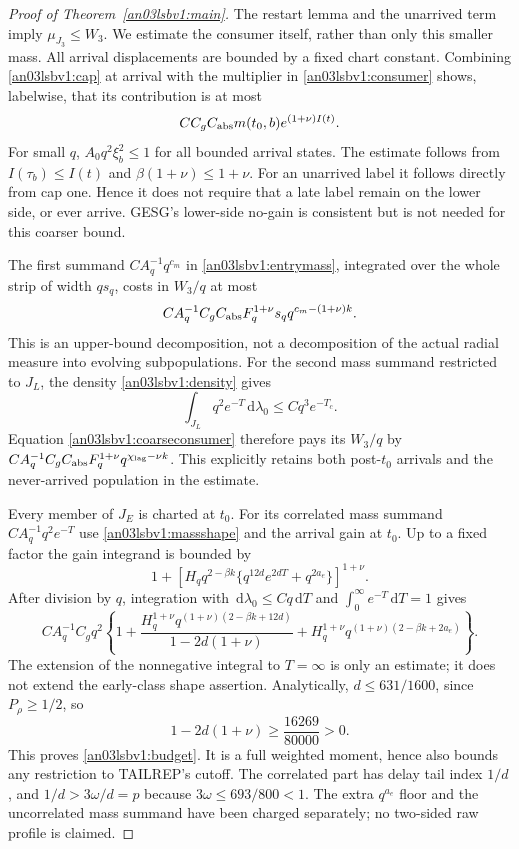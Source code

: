 \documentclass[11pt]{article}
\theoremstyle{remark}\newtheorem{remark}[theorem]{Remark}
\newcommand{\dd}{\,\mathrm d}
\begin{document}
\begin{proof}[Proof of Theorem~\ref{an03lsbv1:main}]
The restart lemma and the unarrived term imply $\mu_{J_3}\le W_3$.
We estimate the consumer itself, rather than only this smaller mass.
All arrival displacements are bounded by a fixed chart constant.
Combining \eqref{an03lsbv1:cap} at arrival with the multiplier in
\eqref{an03lsbv1:consumer} shows, labelwise, that its contribution is
at most
\begin{equation}
 C C_g C_{\rm abs}m(t_0,b)e^{(1+\nu)I(t)}.
 \label{an03lsbv1:coarseconsumer}
\end{equation}
For small $q$, $A_0q^2\xi_b^2\le1$ for all bounded arrival states.
The estimate follows from $I(\tau_b)\le I(t)$ and
$\beta(1+\nu)\le1+\nu$. For an unarrived label it follows directly
from cap one. Hence it does not require that a late label remain
on the lower side, or ever arrive. GESG's lower-side no-gain is
consistent but is not needed for this coarser bound.

The first summand $C A_q^{-1}q^{c_m}$ in
\eqref{an03lsbv1:entrymass}, integrated over the whole strip of
width $qs_q$, costs in $W_3/q$ at most
\[
 C A_q^{-1}C_g C_{\rm abs}F_q^{1+\nu}s_q
                          q^{c_m-(1+\nu)k}.
\]
This is an upper-bound decomposition, not a decomposition of the
actual radial measure into evolving subpopulations.
For the second mass summand restricted to $J_L$, the density
\eqref{an03lsbv1:density} gives
\[
 \int_{J_L}q^2e^{-T}\dd\lambda_0\le Cq^3e^{-T_c}.
\]
Equation \eqref{an03lsbv1:coarseconsumer} therefore pays its $W_3/q$
by $C A_q^{-1}C_g C_{\rm abs}F_q^{1+\nu}q^{\chi_{\rm lag}-\nu k}$.
This explicitly retains both post-$t_0$ arrivals and the never-arrived
population in the estimate.

Every member of $J_E$ is charted at $t_0$. For its correlated mass
summand $C A_q^{-1}q^2e^{-T}$ use
\eqref{an03lsbv1:massshape} and the arrival gain at $t_0$. Up to a
fixed factor the gain integrand is bounded by
\[
 1+\left[H_q q^{2-\beta k}
              \{q^{12d}e^{2dT}+q^{2a_e}\}\right]^{1+\nu}.
\]
After division by $q$, integration with
$\dd\lambda_0\le Cq\dd T$ and $\int_0^\infty e^{-T}\dd T=1$ gives
\[
 C A_q^{-1}C_g q^2\left\{1+
 \frac{H_q^{1+\nu}q^{(1+\nu)(2-\beta k+12d)}}
      {1-2d(1+\nu)}
 +H_q^{1+\nu}q^{(1+\nu)(2-\beta k+2a_e)}\right\}.
\]
The extension of the nonnegative integral to $T=\infty$ is only
an estimate; it does not extend the early-class shape assertion.
Analytically, $d\le631/1600$, since $P_\rho\ge1/2$, so
\begin{equation}
 1-2d(1+\nu)\ge\frac{16269}{80000}>0.
 \label{an03lsbv1:momentmargin}
\end{equation}
This proves \eqref{an03lsbv1:budget}. It is a full weighted moment,
hence also bounds any restriction to TAILREP's cutoff. The correlated
part has delay tail index $1/d$, and
$1/d>3\omega/d=p$ because $3\omega\le693/800<1$.
The extra $q^{a_e}$ floor and the uncorrelated mass summand have
been charged separately; no two-sided raw profile is claimed.


\end{proof}
\end{document}
